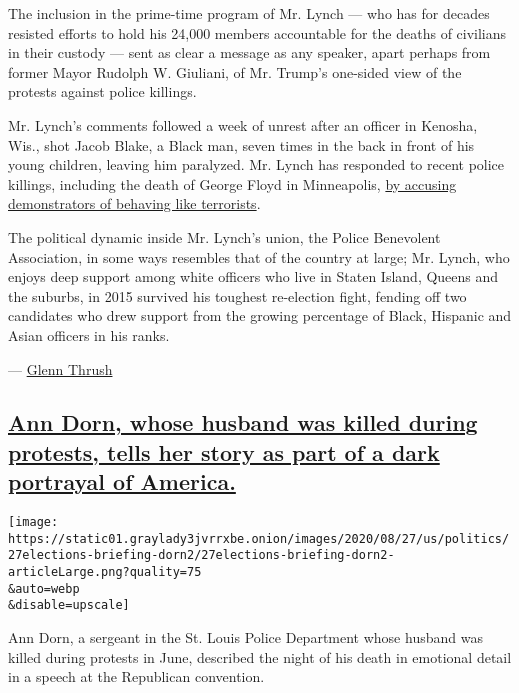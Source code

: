 The inclusion in the prime-time program of Mr. Lynch --- who has for
decades resisted efforts to hold his 24,000 members accountable for the
deaths of civilians in their custody --- sent as clear a message as any
speaker, apart perhaps from former Mayor Rudolph W. Giuliani, of Mr.
Trump's one-sided view of the protests against police killings.

Mr. Lynch's comments followed a week of unrest after an officer in
Kenosha, Wis., shot Jacob Blake, a Black man, seven times in the back in
front of his young children, leaving him paralyzed. Mr. Lynch has
responded to recent police killings, including the death of George Floyd
in Minneapolis,
\href{https://www.newyorker.com/magazine/2020/08/03/how-police-unions-fight-reform}{by
accusing demonstrators of behaving like terrorists}.

The political dynamic inside Mr. Lynch's union, the Police Benevolent
Association, in some ways resembles that of the country at large; Mr.
Lynch, who enjoys deep support among white officers who live in Staten
Island, Queens and the suburbs, in 2015 survived his toughest
re-election fight, fending off two candidates who drew support from the
growing percentage of Black, Hispanic and Asian officers in his ranks.

--- \href{https://www.nytimes3xbfgragh.onion/by/glenn-thrush}{Glenn
Thrush}

\hypertarget{ann-dorn-whose-husband-was-killed-during-protests-tells-her-story-as-part-of-a-dark-portrayal-of-america}{%
\subsection{\texorpdfstring{\protect\hyperlink{ann-dorn-whose-husband-was-killed-during-protests-tells-her-story-as-part-of-a-dark-portrayal-of-america}{Ann
Dorn, whose husband was killed during protests, tells her story as part
of a dark portrayal of
America.}}{Ann Dorn, whose husband was killed during protests, tells her story as part of a dark portrayal of America.}}\label{ann-dorn-whose-husband-was-killed-during-protests-tells-her-story-as-part-of-a-dark-portrayal-of-america}}

\texttt{[image: https://static01.graylady3jvrrxbe.onion/images/2020/08/27/us/politics/27elections-briefing-dorn2/27elections-briefing-dorn2-articleLarge.png?quality=75\\\&auto=webp\\\&disable=upscale]}

Ann Dorn, a sergeant in the St. Louis Police Department whose husband
was killed during protests in June, described the night of his death in
emotional detail in a speech at the Republican convention.


